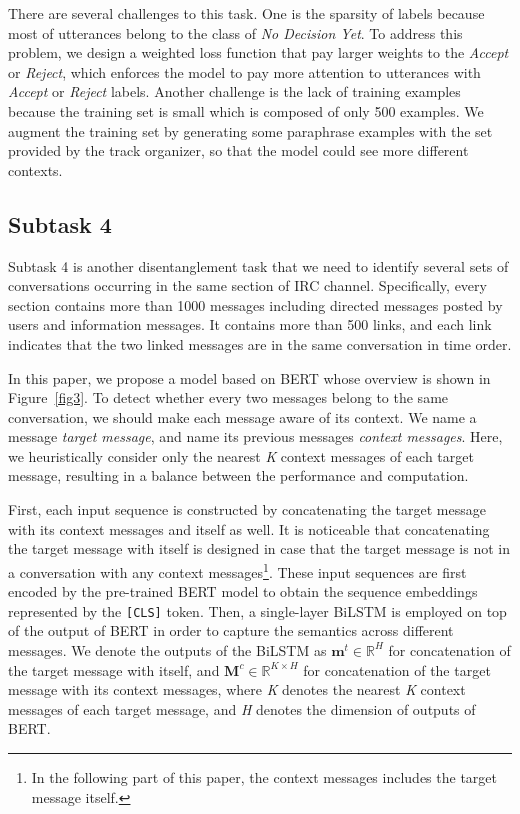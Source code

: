 \documentclass[letterpaper]{article} \usepackage{aaai20}  \usepackage{times}  \usepackage{helvet} \usepackage{courier}  \usepackage[hyphens]{url}  \usepackage{graphicx} \urlstyle{rm} \def\UrlFont{\rm}  \usepackage{graphicx}  \frenchspacing  \setlength{\pdfpagewidth}{8.5in}  \setlength{\pdfpageheight}{11in}
\begin{document}
    There are several challenges to this task.
    One is the sparsity of labels because most of utterances belong to the class of \emph{No Decision Yet}.
    To address this problem, we design a weighted loss function that pay larger weights to the \emph{Accept} or \emph{Reject}, which enforces the model to pay more attention to utterances with \emph{Accept} or \emph{Reject} labels.
    Another challenge is the lack of training examples because the training set is small which is composed of only 500 examples.
    We augment the training set by generating some paraphrase examples with the set provided by the track organizer, so that the model could see more different contexts.


  \subsection{Subtask 4}

    Subtask 4 is another disentanglement task that we need to identify several sets of conversations occurring in the same section of IRC channel.
    Specifically, every section contains more than 1000 messages including directed messages posted by users and information messages.
    It contains more than 500 links, and each link indicates that the two linked messages are in the same conversation in time order.

    In this paper, we propose a model based on BERT whose overview is shown in Figure~\ref{fig3}.
    To detect whether every two messages belong to the same conversation, we should make each message aware of its context.
    We name a message \emph{target message}, and name its previous messages \emph{context messages}.
    Here, we heuristically consider only the nearest \emph{K} context messages of each target message, resulting in a balance between the performance and computation.

    First, each input sequence is constructed by concatenating the target message with its context messages and itself as well.
    It is noticeable that concatenating the target message with itself is designed in case that the target message is not in a conversation with any context messages\footnote{In the following part of this paper, the context messages includes the target message itself.}.
    These input sequences are first encoded by the pre-trained BERT model to obtain the sequence embeddings represented by the \texttt{[CLS]} token.
    Then, a single-layer BiLSTM is employed on top of the output of BERT in order to capture the semantics across different messages.
We denote the outputs of the BiLSTM as $\textbf{m}^t \in \mathbb{R}^{H}$ for concatenation of the target message with itself, and $\textbf{M}^{c} \in \mathbb{R}^{K\times H}$ for concatenation of the target message with its context messages, where \emph{K} denotes the nearest \emph{K} context messages of each target message, and \emph{H} denotes the dimension of outputs of BERT.
\end{document}
